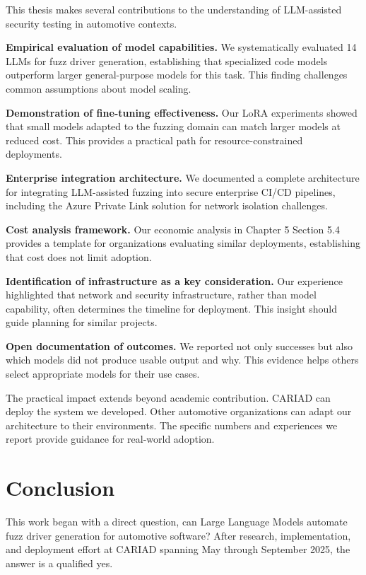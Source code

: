 This thesis makes several contributions to the understanding of LLM-assisted security testing in automotive contexts.

\textbf{Empirical evaluation of model capabilities.} We systematically evaluated 14 LLMs for fuzz driver generation, establishing that specialized code models outperform larger general-purpose models for this task. This finding challenges common assumptions about model scaling.

\textbf{Demonstration of fine-tuning effectiveness.} Our LoRA experiments showed that small models adapted to the fuzzing domain can match larger models at reduced cost. This provides a practical path for resource-constrained deployments.

\textbf{Enterprise integration architecture.} We documented a complete architecture for integrating LLM-assisted fuzzing into secure enterprise CI/CD pipelines, including the Azure Private Link solution for network isolation challenges.

\textbf{Cost analysis framework.} Our economic analysis in Chapter 5 Section 5.4 provides a template for organizations evaluating similar deployments, establishing that cost does not limit adoption.

\textbf{Identification of infrastructure as a key consideration.} Our experience highlighted that network and security infrastructure, rather than model capability, often determines the timeline for deployment. This insight should guide planning for similar projects.

\textbf{Open documentation of outcomes.} We reported not only successes but also which models did not produce usable output and why. This evidence helps others select appropriate models for their use cases.

The practical impact extends beyond academic contribution. CARIAD can deploy the system we developed. Other automotive organizations can adapt our architecture to their environments. The specific numbers and experiences we report provide guidance for real-world adoption.


\section{Conclusion}
\label{sec:discussion_conclusion}

This work began with a direct question, can Large Language Models automate fuzz driver generation for automotive software? After research, implementation, and deployment effort at CARIAD spanning May through September 2025, the answer is a qualified yes.

